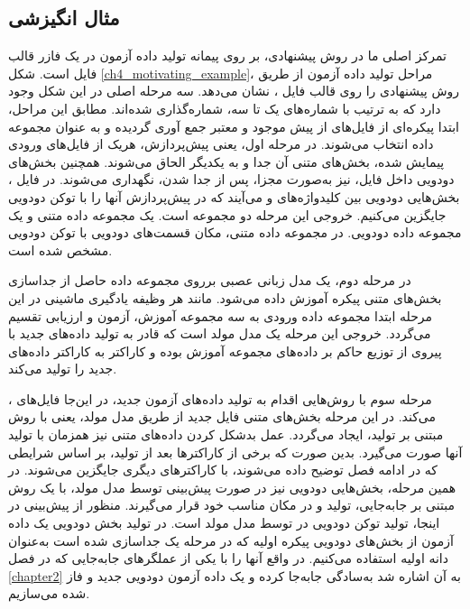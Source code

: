 \subsection{مثال انگیزشی}
تمرکز اصلی ما در روش پیشنهادی، بر روی پیمانه تولید داده آزمون در یک فازر قالب فایل است. شکل \ref{ch4_motivating_example}، مراحل تولید داده آزمون از طریق روش پیشنهادی را روی قالب فایل ، نشان می‌دهد. سه مرحله اصلی در این شکل وجود دارد که به ترتیب با شماره‌های یک تا سه، شماره‌گذاری شده‌اند. مطابق این مراحل، ابتدا پیکره‌ای از فایل‌های از پیش موجود و معتبر جمع آوری گردیده و به عنوان مجموعه داده انتخاب می‌شوند. در مرحله اول، یعنی پیش‌پردازش، هریک از فایل‌های ورودی پیمایش شده، بخش‌های متنی آن جدا و به یکدیگر الحاق می‌شوند. همچنین بخش‌های دودویی داخل فایل، نیز به‌صورت مجزا، پس از جدا شدن، نگهداری می‌شوند. در فایل ، بخش‌هایی دودویی بین کلیدواژه‌های 
 و 
می‌آیند که در پیش‌پردازش آنها را با توکن دودویی 
جایگزین می‌کنیم. خروجی این مرحله دو مجموعه است. یک مجموعه داده متنی و یک مجموعه داده دودویی. در مجموعه داده متنی، مکان قسمت‌های دودویی با توکن دودویی مشخص شده است.

در مرحله دوم، یک مدل زبانی عصبی برروی مجموعه داده حاصل از جداسازی بخش‌های متنی پیکره آموزش داده می‌شود. مانند هر وظیفه یادگیری ماشینی در این مرحله ابتدا مجموعه داده ورودی به سه مجموعه آموزش، آزمون و ارزیابی تقسیم می‌گردد. خروجی این مرحله یک مدل مولد است که قادر به تولید داده‌های جدید با پیروی از توزیع حاکم بر داده‌های مجموعه آموزش بوده و کاراکتر به کاراکتر داده‌های جدید را تولید می‌کند.

مرحله سوم با روش‌هایی اقدام به تولید داده‌های آزمون جدید، در این‌جا فایل‌های 
،
می‌کند. در این مرحله بخش‌های متنی فایل جدید از طریق مدل مولد، یعنی با روش مبتنی بر تولید، ایجاد می‌گردد. عمل بدشکل کردن داده‌های متنی نیز همزمان با تولید آنها صورت می‌گیرد. بدین صورت که برخی از کاراکترها بعد از تولید، بر اساس شرایطی که در ادامه فصل توضیح داده می‌شوند، با کاراکترهای دیگری جایگزین می‌شوند. در همین مرحله، بخش‌هایی دودویی نیز در صورت پیش‌بینی توسط مدل مولد، با یک روش مبتنی بر جابه‌جایی، تولید و در مکان مناسب خود قرار می‌گیرند. منظور از پیش‌بینی در اینجا، تولید توکن دودویی 
در توسط مدل مولد است. در تولید بخش دودویی یک داده‌ آزمون از بخش‌های دودویی پیکره اولیه که در مرحله یک جداسازی شده است به‌عنوان دانه اولیه استفاده می‌کنیم. در واقع آنها را با یکی از عملگر‌های جابه‌جایی که در فصل 
\ref{chapter2}
 به آن اشاره شد به‌سادگی جابه‌جا کرده و یک داده آزمون دودویی جدید و فاز شده می‌سازیم. 

